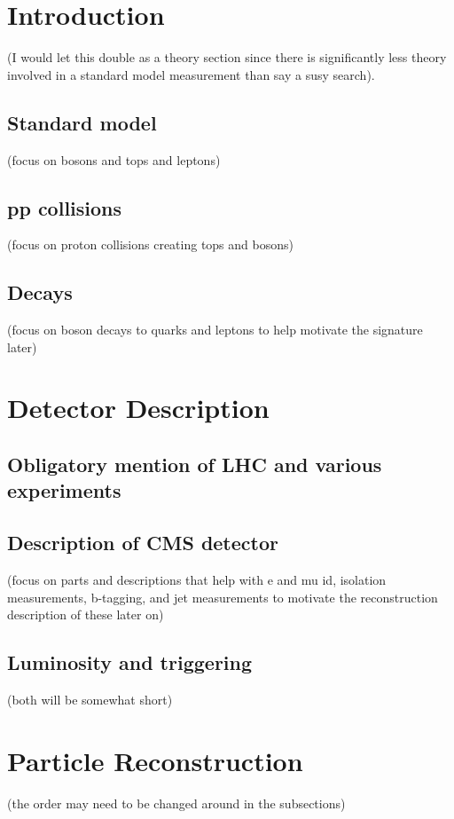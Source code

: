 \documentclass[12pt,chapterheads,oneside]{ucsd}
\begin{document}
\graphicspath{
{Figs/}
}




\chapter{Introduction}     
	(I would let this double as a theory section since there is significantly less theory involved in a standard model measurement than say a susy search).
	\section{Standard model}
		(focus on bosons and tops and leptons)
	\section{pp collisions}          
		(focus on proton collisions creating tops and bosons)
	\section{Decays}
    		(focus on boson decays to quarks and leptons to help motivate the signature later)

\chapter{Detector Description}
	\section{Obligatory mention of LHC and various experiments}
	\section{Description of CMS detector}        
		(focus on parts and descriptions that help with e and mu id, isolation measurements, b-tagging, and jet measurements to motivate the reconstruction description of these later on)
	\section{Luminosity and triggering}        
		(both will be somewhat short)

\chapter{Particle Reconstruction}
                (the order may need to be changed around in the subsections)
\end{document}
